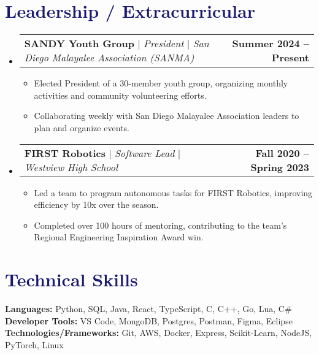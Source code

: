 \documentclass[letterpaper,11pt]{article}
\makeatletter
\newcommand{\resumeItem}[1]{
  \item\small{
    {#1 \vspace{-2pt}}
  }
}
\newcommand{\resumeProjectHeading}[2]{
    \item
    \begin{tabular*}{1.001\textwidth}{l@{\extracolsep{\fill}}r}
      \small#1 & \textbf{\small #2}\\
    \end{tabular*}\vspace{-7pt}
}
\newcommand{\resumeSubHeadingListStart}{\begin{itemize}[leftmargin=0.0in, label={}]}
\newcommand{\resumeSubHeadingListEnd}{\end{itemize}}
\newcommand{\resumeItemListStart}{\begin{itemize}}
\newcommand{\resumeItemListEnd}{\end{itemize}\vspace{-5pt}}
\newcommand\accentColor{MidnightBlue}
\makeatother
\begin{document}
\section{\textcolor{\accentColor}{Leadership / Extracurricular}}
    \vspace{-7pt}
    \resumeSubHeadingListStart
        \resumeProjectHeading
            {\textbf{SANDY Youth Group} $|$ \emph{President} $|$ \emph{San Diego Malayalee Association (SANMA)}}{Summer 2024 -- Present}
            \resumeItemListStart
                \resumeItem{Elected President of a 30-member youth group, organizing monthly activities and community volunteering efforts.}
                \resumeItem{Collaborating weekly with San Diego Malayalee Association leaders to plan and organize events.}
            \resumeItemListEnd
            \vspace{-15pt}
        \resumeProjectHeading
            {\textbf{FIRST Robotics} $|$ \emph{Software Lead} $|$ \emph{Westview High School}}{Fall 2020 -- Spring 2023}
            \resumeItemListStart
                \resumeItem{Led a team to program autonomous tasks for FIRST Robotics, improving efficiency by 10x over the season.}
                \resumeItem{Completed over 100 hours of mentoring, contributing to the team's Regional Engineering Inspiration Award win.}
            \resumeItemListEnd
    \resumeSubHeadingListEnd
\vspace{-15pt}
    
\section{\textcolor{\accentColor}{Technical Skills}}
 \begin{itemize}[leftmargin=0.15in, label={}]
    \small{\item{
     \textbf{Languages: }{Python, SQL, Java, React, TypeScript, C, C++, Go, Lua, C\#} \\
     \textbf{Developer Tools: }{VS Code, MongoDB, Postgres, Postman, Figma, Eclipse} \\
     \textbf{Technologies/Frameworks: }{Git, AWS, Docker, Express, Scikit-Learn, NodeJS, PyTorch, Linux} \\
    }}
 \end{itemize}
 \vspace{-8pt}
\end{document}
